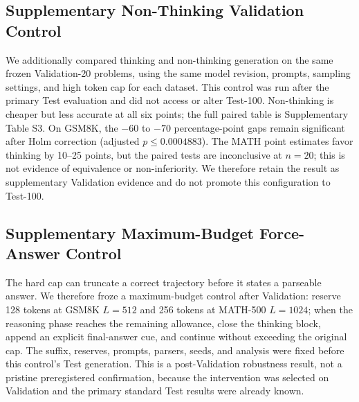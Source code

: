 \documentclass[runningheads]{llncs}
\begin{document}
\subsection{Supplementary Non-Thinking Validation Control}

We additionally compared thinking and non-thinking generation on the same
frozen Validation-20 problems, using the same model revision, prompts,
sampling settings, and high token cap for each dataset. This control was run
after the primary Test evaluation and did not access or alter Test-100.
Non-thinking is cheaper but less accurate at all six points; the full paired
table is Supplementary Table S3. On GSM8K, the
$-60$ to $-70$ percentage-point gaps remain significant after Holm correction
(adjusted $p\leq0.0004883$). The MATH point estimates favor thinking by
10--25 points, but the paired tests are inconclusive at $n=20$; this is not
evidence of equivalence or non-inferiority. We therefore retain the result as
supplementary Validation evidence and do not promote this configuration to
Test-100.

\subsection{Supplementary Maximum-Budget Force-Answer Control}

The hard cap can truncate a correct trajectory before it states a parseable
answer. We therefore froze a maximum-budget control after Validation: reserve
128 tokens at GSM8K $L=512$ and 256 tokens at MATH-500 $L=1024$; when the
reasoning phase reaches the remaining allowance, close the thinking block,
append an explicit final-answer cue, and continue without exceeding the
original cap. The suffix, reserves, prompts, parsers, seeds, and analysis were
fixed before this control's Test generation. This is a post-Validation
robustness result, not a pristine preregistered confirmation, because the
intervention was selected on Validation and the primary standard Test results
were already known.
\end{document}
